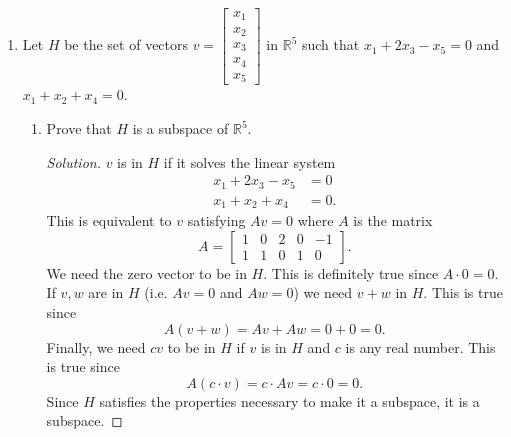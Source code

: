 \documentclass[11pt,letterpaper]{report}
\newcommand{\reals}{\mathbb{R}}
\newenvironment{solution}
{\begin{proof}[Solution]}
{\end{proof}}
\begin{document}
\begin{enumerate}
\begin{enumerate}
		\item Find all real numbers $k$ such that the given matrix is not invertible.
		\begin{solution}
			$A$ is singular if and only if its determinant is zero. We'll compute the determinant using cofactor expansion. We can expand along any row or column we want. The first row seems good since it has a zero in it (in general, you'll want to expand along the row or column with the most zeros since this expansion will have the fewest terms). Remember to alternate the sign!
			\begin{align*}
				\det A &= k \begin{vmatrix}
					-2 & 1\\3&2
				\end{vmatrix} - \begin{vmatrix}
					k^2+1 & 1\\
					k-1 & 2
				\end{vmatrix}\\
				&= -2k^2 - 6k - 3.
			\end{align*}
			Since we need the determinant of $A$ to be zero, we set $-2k^2-6k-3 = 0$ and use the quadratic formula to obtain
			\[
			k = \frac{-3 \pm \sqrt{3}}{2}.
			\]
		\end{solution}
	\end{enumerate}

	\item Let $H$ be the set of vectors $v = \begin{bmatrix}
		x_1\\x_2\\x_3\\x_4\\x_5
	\end{bmatrix}$ in $\reals^5$ such that $x_1+2x_3-x_5 = 0$ and $x_1+x_2+x_4 = 0$.
	\begin{enumerate}
		\item Prove that $H$ is a subspace of $\reals^5$.
		\begin{solution}
			$v$ is in $H$ if it solves the linear system
			\begin{equation}\label{linear}
			\begin{split}
				x_1+2x_3-x_5 &= 0\\
				x_1+x_2+x_4&= 0.
			\end{split}
			\end{equation}
			This is equivalent to $v$ satisfying $Av = 0$ where $A$ is the matrix
			\[
			A = \begin{bmatrix}
				1 & 0 & 2 & 0 & -1\\
				1 & 1 & 0 & 1 & 0
			\end{bmatrix}.
			\]
			We need the zero vector to be in $H$. This is definitely true since $A\cdot 0 = 0$. If $v,w$ are in $H$ (i.e. $Av = 0$ and $Aw = 0$) we need $v+w$ in $H$. This is true since
			\[
			A(v+w) = Av+Aw = 0+0 = 0.
			\]
			Finally, we need $cv$ to be in $H$ if $v$ is in $H$ and $c$ is any real number. This is true since
			\[
			A(c\cdot v) = c\cdot Av = c\cdot 0 = 0.
			\]
			Since $H$ satisfies the properties necessary to make it a subspace, it is a subspace.
		\end{solution}


\end{enumerate}
\end{enumerate}
\end{document}
